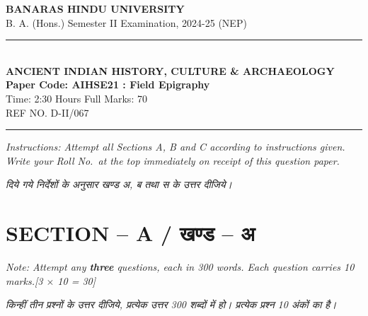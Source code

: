 \documentclass[11pt,a4paper]{article}
\newcommand{\pts}[1]{\hfill \textit{[#1]}}
\begin{document}
\begin{center}
  {\large\bfseries BANARAS HINDU UNIVERSITY}\\[2pt]
  {\normalsize B. A. (Hons.) Semester II Examination, 2024-25 (NEP)}\\[6pt]
  \rule{0.8\linewidth}{0.5pt}\\[6pt]
  {\large\bfseries ANCIENT INDIAN HISTORY, CULTURE \& ARCHAEOLOGY}\\[4pt]
  {\large\bfseries Paper Code: AIHSE21 : Field Epigraphy}\\[4pt]
  {\normalsize Time: 2:30 Hours \hfill Full Marks: 70}\\[2pt]
  {\small REF NO. D-II/067}
\end{center}
\rule{\linewidth}{0.4pt}
\smallskip

\noindent \textit{Instructions: Attempt all Sections A, B and C according to instructions given. Write your Roll No.\ at the top immediately on receipt of this question paper.}

\smallskip
\noindent \textit{दिये गये निर्देशों के अनुसार खण्ड अ, ब तथा स के उत्तर दीजिये।}

\bigskip

\section*{SECTION -- A / खण्ड -- अ}
\noindent \textit{Note: Attempt any \textbf{three} questions, each in 300 words. Each question carries 10 marks.}\pts{3 $\times$ 10 = 30}

\noindent \textit{किन्हीं तीन प्रश्नों के उत्तर दीजिये, प्रत्येक उत्तर 300 शब्दों में हो। प्रत्येक प्रश्न 10 अंकों का है।}
\end{document}
